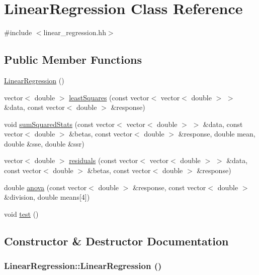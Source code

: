 \hypertarget{classLinearRegression}{
\section{LinearRegression Class Reference}
\label{classLinearRegression}
}


{\ttfamily \#include $<$linear\_\-regression.hh$>$}

\subsection*{Public Member Functions}
\begin{DoxyCompactItemize}
\item 
\hyperlink{classLinearRegression_afeb4c101e4e8b20a75db3d4ce3f1cbc6}{LinearRegression} ()
\item 
vector$<$ double $>$ \hyperlink{classLinearRegression_a37f79d0d49e5fe93cf5a04b20d17d829}{leastSquares} (const vector$<$ vector$<$ double $>$ $>$ \&data, const vector$<$ double $>$ \&response)
\item 
void \hyperlink{classLinearRegression_a54ba438eebfb5045c7e6d02545adf346}{sumSquaredStats} (const vector$<$ vector$<$ double $>$ $>$ \&data, const vector$<$ double $>$ \&betas, const vector$<$ double $>$ \&response, double mean, double \&sse, double \&ssr)
\item 
vector$<$ double $>$ \hyperlink{classLinearRegression_a1c6ed479606439a1943f75c888e8f2bd}{residuals} (const vector$<$ vector$<$ double $>$ $>$ \&data, const vector$<$ double $>$ \&betas, const vector$<$ double $>$ \&response)
\item 
double \hyperlink{classLinearRegression_affb7f28584f32975adf12f3a624cfe15}{anova} (const vector$<$ double $>$ \&response, const vector$<$ double $>$ \&division, double means\mbox{[}4\mbox{]})
\item 
void \hyperlink{classLinearRegression_a866934791e5415bf573a9030650ef8cb}{test} ()
\end{DoxyCompactItemize}


\subsection{Constructor \& Destructor Documentation}
\hypertarget{classLinearRegression_afeb4c101e4e8b20a75db3d4ce3f1cbc6}{
\subsubsection[{LinearRegression}]{\setlength{\rightskip}{0pt plus 5cm}LinearRegression::LinearRegression ()}}
\label{classLinearRegression_afeb4c101e4e8b20a75db3d4ce3f1cbc6}


